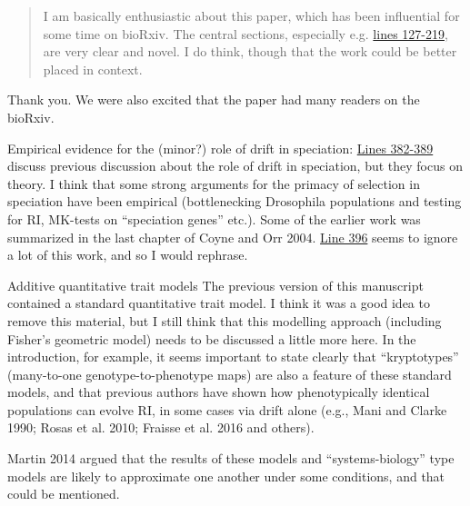 \begin{quote}
  I am basically enthusiastic about this paper, which has been influential for some time on bioRxiv. The central sections, especially e.g. \hyperlink{rev1:1}{lines 127-219}, are very clear and novel. I do think, though that the work could be better placed in context.
\end{quote}

Thank you. We were also excited that the paper had many readers on the bioRxiv. 

\begin{point}{Empirical evidence for the (minor?) role of drift in speciation:}
%
  \hyperlink{rev1:2}{Lines 382-389} discuss previous discussion about the role of drift in speciation, but they focus on theory. I think that some strong arguments for the primacy of selection in speciation have been empirical (bottlenecking Drosophila populations and testing for RI, MK-tests on ``speciation genes'' etc.). Some of the earlier work was summarized in the last chapter of Coyne and Orr 2004. \hyperlink{rev1:3}{Line 396} seems to ignore a lot of this work, and so I would rephrase.
\end{point}


\begin{point}{Additive quantitative trait models}
%
The previous version of this manuscript contained a standard quantitative trait model. I think it was a good idea to remove this material, but I still think that this modelling approach (including Fisher’s geometric model) needs to be discussed a little more here. In the introduction, for example, it seems important to state clearly that ``kryptotypes'' (many-to-one genotype-to-phenotype maps) are also a feature of these standard models, and that previous authors have shown how phenotypically identical populations can evolve RI, in some cases via drift alone (e.g., Mani and Clarke 1990; Rosas et al. 2010; Fraisse et al. 2016 and others).

Martin 2014 argued that the results of these models and ``systems-biology'' type models are likely to approximate one another under some conditions, and that could be mentioned.
\end{point}


